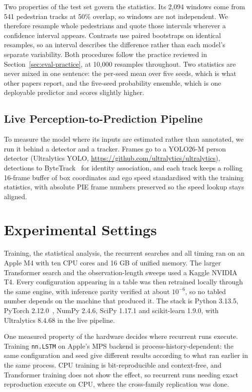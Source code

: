\documentclass[mti,article,submit,moreauthors]{Definitions/mdpi}
\begin{document}
Two properties of the test set govern the statistics. Its 2,094 windows come from 541 pedestrian tracks at 50\% overlap, so windows are not independent. We therefore resample whole pedestrians and quote those intervals wherever a confidence interval appears. Contrasts use paired bootstraps on identical resamples, so an interval describes the difference rather than each model's separate variability. Both procedures follow the practice reviewed in Section~\ref{sec:eval-practice}, at 10,000 resamples throughout. Two statistics are never mixed in one sentence: the per-seed mean over five seeds, which is what other papers report, and the five-seed probability ensemble, which is one deployable predictor and scores slightly higher.

\subsection{Live Perception-to-Prediction Pipeline}

To measure the model where its inputs are estimated rather than annotated, we run it behind a detector and a tracker. Frames go to a YOLO26-M person detector (Ultralytics YOLO, \url{https://github.com/ultralytics/ultralytics}), detections to ByteTrack~\citep{zhang2022bytetrack} for identity association, and each track keeps a rolling 16-frame buffer of box coordinates and ego speed standardised with the training statistics, with absolute PIE frame numbers preserved so the speed lookup stays aligned.

\section{Experimental Settings}
\label{sec:settings}

Training, the statistical analysis, the recurrent searches and all timing ran on an Apple M4 with ten CPU cores and 16 GB of unified memory. The larger Transformer search and the observation-length sweeps used a Kaggle NVIDIA T4. Every configuration appearing in a table was then retrained locally through the same engine, with inference parity verified at about $10^{-6}$, so no tabled number depends on the machine that produced it. The stack is Python 3.13.5, PyTorch 2.12.0~\citep{paszke2019pytorch}, NumPy 2.4.6, SciPy 1.17.1 and scikit-learn 1.9.0, with Ultralytics 8.4.68 in the live pipeline.

One measured property of the hardware decides where recurrent runs execute. Training \texttt{nn.LSTM} on Apple's MPS backend is process-history-dependent: the same configuration and seed give different results according to what ran earlier in the same process. CPU training is bit-reproducible and context-free, and Transformer training does not show the effect, so recurrent runs needing exact reproduction execute on CPU, where the cross-family replication was done.
\end{document}
